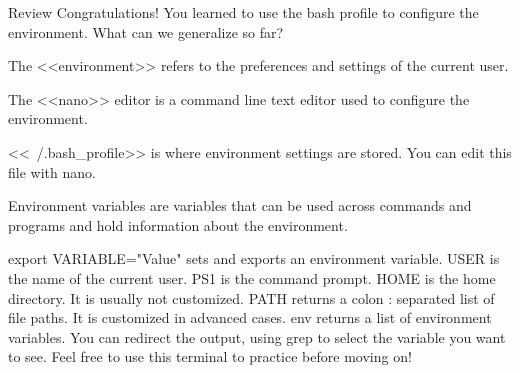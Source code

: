 Review
    Congratulations! You learned to use the bash profile to configure the environment. What can we generalize so far?

        The <<environment>> refers to the preferences and settings of the current user.

        The <<nano>> editor is a command line text editor used to configure the environment.

        <<~/.bash_profile>> is where environment settings are stored. You can edit this file with nano.

        Environment variables are variables that can be used across commands and programs and hold information about the environment.

            export VARIABLE="Value" sets and exports an environment variable.
            USER is the name of the current user.
            PS1 is the command prompt.
            HOME is the home directory. It is usually not customized.
            PATH returns a colon : separated list of file paths. It is customized in advanced cases.
            env returns a list of environment variables. You can redirect the output, using grep to select the variable you want to see.
    Feel free to use this terminal to practice before moving on!